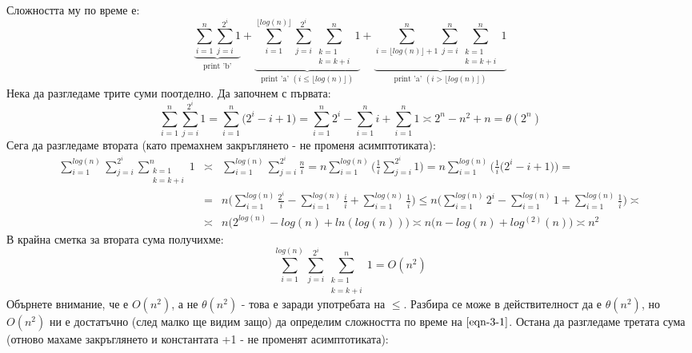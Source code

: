 \begin{solution}
	Сложността му по време е:
	\begin{equation}\label{eqn-3-1}
		\underbrace{\sum\limits_{i=1}^{n}\sum\limits_{j=i}^{2^i}1}_{\text{print 'b'}}+\underbrace{\sum\limits_{i=1}^{\lfloor log(n)\rfloor}\sum\limits_{j=i}^{2^i}\sum\limits_{\substack{k=1\\k=k+i}}^n1}_{\text{print 'a' }(i\le\lfloor log(n)\rfloor)}+\underbrace{\sum\limits_{i=\lfloor log(n)\rfloor+1}^n\sum\limits_{j=i}^n\sum\limits_{\substack{k=1\\k=k+i}}^n1}_{\text{print 'a' }(i>\lfloor log(n)\rfloor)}
	\end{equation}
	Нека да разгледаме трите суми поотделно. Да започнем с първата:
	\begin{equation*}
		\sum\limits_{i=1}^n\sum\limits_{j=i}^{2^i}1=\sum\limits_{i=1}^n\Big(2^i-i+1\Big)=\sum\limits_{i=1}^n2^i-\sum\limits_{i=1}^ni+\sum\limits_{i=1}^n1\asymp2^n-n^2+n=\theta(2^n)
	\end{equation*}
	Сега да разгледаме втората (като премахнем закръглянето - не променя асимптотиката):
	\begin{eqnarray*}
		\sum\limits_{i=1}^{log(n)}\sum\limits_{j=i}^{2^i}\sum\limits_{\substack{k=1\\k=k+i}}^n1 &\asymp& 
		\sum\limits_{i=1}^{log(n)}\sum\limits_{j=i}^{2^i}\frac ni =
		n\sum\limits_{i=1}^{log(n)}\bigg(\frac1i\sum\limits_{j=i}^{2^i}1\bigg) =
		n\sum\limits_{i=1}^{log(n)}\bigg(\frac1i\Big(2^i-i+1\Big)\bigg) =\\
		&=&
		n\Bigg(\sum\limits_{i=1}^{log(n)}\frac{2^i}i-\sum\limits_{i=1}^{log(n)}\frac ii+\sum\limits_{i=1}^{log(n)}\frac1i\Bigg) \le
		n\Bigg(\sum\limits_{i=1}^{log(n)}2^i-\sum\limits_{i=1}^{log(n)}1+\sum\limits_{i=1}^{log(n)}\frac1i\Bigg) \asymp \\
		&\asymp&
		n\Big(2^{log(n)}-log(n)+ln(log(n))\Big) \asymp n\Big(n-log(n)+log^{(2)}(n)\Big) \asymp n^2
	\end{eqnarray*}
	В крайна сметка за втората сума получихме:
	\begin{equation*}
		\sum\limits_{i=1}^{log(n)}\sum\limits_{j=i}^{2^i}\sum\limits_{\substack{k=1\\k=k+i}}^n1=O(n^2)
	\end{equation*}
	Обърнете внимание, че е $O(n^2)$, а не $\theta(n^2)$ - това е заради употребата на $\le$. Разбира се може в действителност да е $\theta(n^2)$, но $O(n^2)$ ни е достатъчно (след малко ще видим защо) да определим сложността по време на $\ref{eqn-3-1}$. Остана да разгледаме третата сума (отново махаме закръглянето и константата +1 - не променят асимптотиката):

\end{solution}
